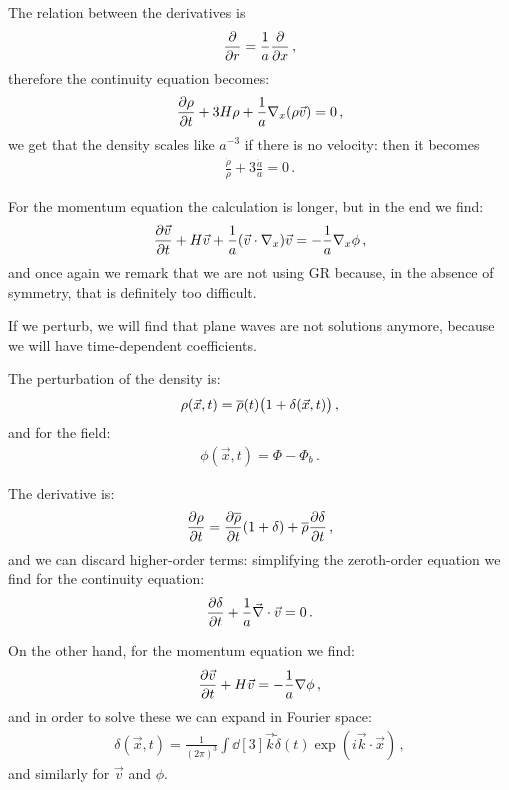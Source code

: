\documentclass[main.tex]{subfiles}
\begin{document}
The relation between the derivatives is 
%
\begin{align}
  \pdv{}{r} = \frac{1}{a } \pdv{}{x}
\,,
\end{align}
%
therefore the continuity equation becomes:
%
\begin{align}
  \pdv{\rho }{t} + 3H \rho + \frac{1}{a} \nabla_{x} \qty(\rho \vec{v}) = 0
\,,
\end{align}
%
we get that the density scales like \(a^{-3}\) if there is no velocity: then it becomes 
%
\begin{align}
  \frac{\dot{\rho}}{\rho } + 3 \frac{\dot{a}}{a} =0 
\,.
\end{align}
%

For the momentum equation the calculation is longer, but in the end we find: 
%
\begin{align}
  \pdv{\vec{v}}{t} + H \vec{v} +
  \frac{1}{a} \qty(\vec{v} \cdot \nabla_{x}) \vec{v}
  = - \frac{1}{a} \nabla_{x} \phi 
\,,
\end{align}
%
and once again we remark that we are not using GR because, in the absence of symmetry, that is definitely too difficult. 

If we perturb, we will find that plane waves are not solutions anymore, because we will have time-dependent coefficients. 

The perturbation of the density is: 
%
\begin{align}
  \rho (\vec{x}, t) = \overline{\rho}(t) \qty(1 + \delta (\vec{x}, t))
\,,
\end{align}
%
and for the field: 
%
\begin{align}
  \phi (\vec{x}, t) = \Phi - \Phi_b
\,.
\end{align}

The derivative is: 
%
\begin{align}
  \pdv{\rho }{t} = \pdv{\overline{\rho}}{t} \qty(1 + \delta ) + \overline{\rho} \pdv{ \delta }{t}
\,,
\end{align}
%
and we can discard higher-order terms: simplifying the zeroth-order equation we find for the  continuity equation: 
%
\begin{align}
  \pdv{ \delta }{t} + \frac{1}{a} \vec{\nabla} \cdot \vec{v} = 0
\,.
\end{align}

On the other hand, for the momentum equation we find: 
%
\begin{align}
  \pdv{\vec{v}}{t} + H \vec{v} = - \frac{1}{a} \nabla \phi 
\,,
\end{align}
%
and in order to solve these we can expand in Fourier space: 
%
\begin{align}
  \delta (\vec{x} , t) = 
  \frac{1}{(2 \pi )^3} \int \dd[3]{\vec{k}} \widetilde{\delta} (t) \exp(i \vec{k} \cdot \vec{x})
\,,
\end{align}
%
and similarly for \(\vec{v}\) and \(\phi \). 
\end{document}
